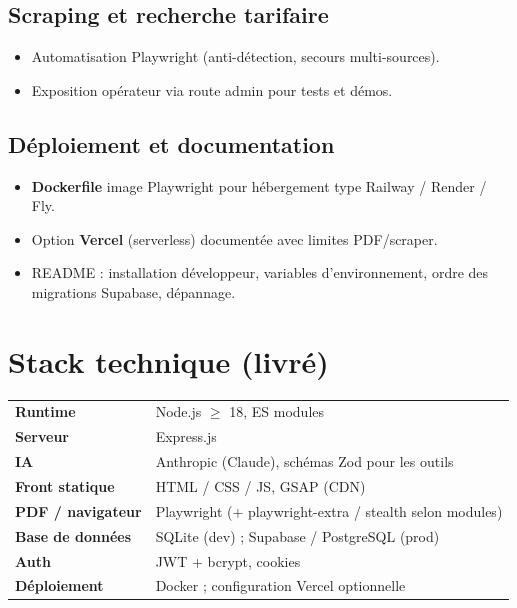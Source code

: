 \documentclass[11pt,a4paper]{article}
\begin{document}
\subsection{Scraping et recherche tarifaire}
\begin{itemize}[leftmargin=*]
  \item Automatisation Playwright (anti-détection, secours multi-sources).
  \item Exposition opérateur via route admin pour tests et démos.
\end{itemize}

\subsection{Déploiement et documentation}
\begin{itemize}[leftmargin=*]
  \item \textbf{Dockerfile} image Playwright pour hébergement type Railway / Render / Fly.
  \item Option \textbf{Vercel} (serverless) documentée avec limites PDF/scraper.
  \item README : installation développeur, variables d'environnement, ordre des migrations Supabase, dépannage.
\end{itemize}

\section{Stack technique (livré)}
\begin{tabular}{@{}ll@{}}
\textbf{Runtime} & Node.js $\geq$ 18, ES modules \\
\textbf{Serveur} & Express.js \\
\textbf{IA} & Anthropic (Claude), schémas Zod pour les outils \\
\textbf{Front statique} & HTML / CSS / JS, GSAP (CDN) \\
\textbf{PDF / navigateur} & Playwright (+ playwright-extra / stealth selon modules) \\
\textbf{Base de données} & SQLite (dev) ; Supabase / PostgreSQL (prod) \\
\textbf{Auth} & JWT + bcrypt, cookies \\
\textbf{Déploiement} & Docker ; configuration Vercel optionnelle \\
\end{tabular}
\end{document}
